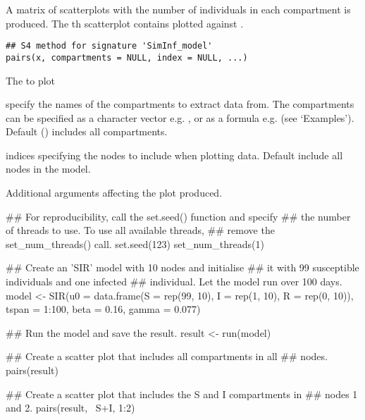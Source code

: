 \documentclass[letterpaper]{book}
\begin{document}
%
\begin{Description}
A matrix of scatterplots with the number of individuals in each
compartment is produced. The th scatterplot contains
 plotted against .
\end{Description}
%
\begin{Usage}
\begin{verbatim}
## S4 method for signature 'SimInf_model'
pairs(x, compartments = NULL, index = NULL, ...)
\end{verbatim}
\end{Usage}
%
\begin{Arguments}
\begin{ldescription}
\item[\code{x}] The  to plot

\item[\code{compartments}] specify the names of the compartments to
extract data from. The compartments can be specified as a
character vector e.g. ,
or as a formula e.g.  (see
`Examples'). Default ()
includes all compartments.

\item[\code{index}] indices specifying the nodes to include when plotting
data. Default  include all nodes in the
model.

\item[\code{...}] Additional arguments affecting the plot produced.
\end{ldescription}
\end{Arguments}
%
\begin{Examples}
\begin{ExampleCode}
## For reproducibility, call the set.seed() function and specify
## the number of threads to use. To use all available threads,
## remove the set_num_threads() call.
set.seed(123)
set_num_threads(1)

## Create an 'SIR' model with 10 nodes and initialise
## it with 99 susceptible individuals and one infected
## individual. Let the model run over 100 days.
model <- SIR(u0 = data.frame(S = rep(99, 10),
                             I = rep(1, 10),
                             R = rep(0, 10)),
             tspan = 1:100,
             beta = 0.16,
             gamma = 0.077)

## Run the model and save the result.
result <- run(model)

## Create a scatter plot that includes all compartments in all
## nodes.
pairs(result)

## Create a scatter plot that includes the S and I compartments in
## nodes 1 and 2.
pairs(result, ~S+I, 1:2)
\end{ExampleCode}
\end{Examples}
\end{document}
